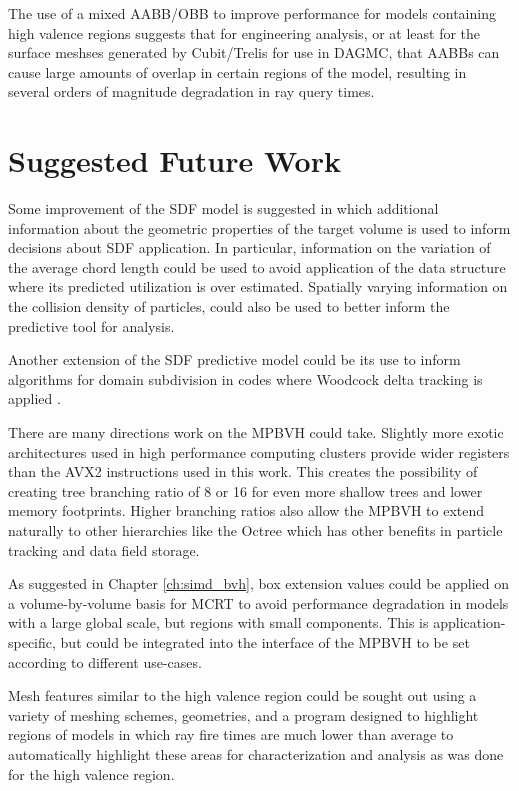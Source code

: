 The use of a mixed AABB/OBB to improve performance for models containing high
valence regions suggests that for engineering analysis, or at least for the
surface meshses generated by Cubit/Trelis for use in DAGMC, that AABBs can cause
large amounts of overlap in certain regions of the model, resulting in several
orders of magnitude degradation in ray query times.

\section{Suggested Future Work}\label{sec:future_work}

Some improvement of the SDF model is suggested in which additional information
about the geometric properties of the target volume is used to inform decisions
about SDF application. In particular, information on the variation of the
average chord length could be used to avoid application of the data structure
where its predicted utilization is over estimated. Spatially varying information
on the collision density of particles, could also be used to better inform the
predictive tool for analysis.

Another extension of the SDF predictive model could be its use to inform
algorithms for domain subdivision in codes where Woodcock delta tracking is
applied \cite{Leppanen_2010} \cite{Yonghao_2011}. 

There are many directions work on the MPBVH could take. Slightly more exotic
architectures used in high performance computing clusters provide wider
registers than the AVX2 instructions used in this work. This creates the
possibility of creating tree branching ratio of 8 or 16 for even more shallow
trees and lower memory footprints. Higher branching ratios also allow the MPBVH
to extend naturally to other hierarchies like the Octree which has other
benefits in particle tracking and data field storage.

As suggested in Chapter \ref{ch:simd_bvh}, box extension values could be applied
on a volume-by-volume basis for MCRT to avoid performance degradation in models
with a large global scale, but regions with small components. This is
application-specific, but could be integrated into the interface of the MPBVH
to be set according to different use-cases.

Mesh features similar to the high valence region could be sought out using a
variety of meshing schemes, geometries, and a program designed to highlight
regions of models in which ray fire times are much lower than average to
automatically highlight these areas for characterization and analysis as was
done for the high valence region. 


